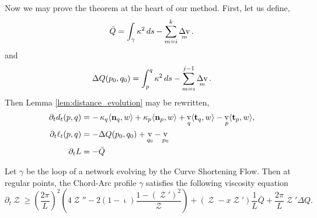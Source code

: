 \documentclass[11pt]{amsart}
\DeclareMathOperator{\tangspeed}{v}
\DeclareMathOperator{\chordarcprofile}{\mathcal{Z}}
\DeclareMathOperator{\corneranglespeed}{{\Delta v}}
\DeclareMathOperator{\tangindicator}{\iota}
\begin{document}
Now we may prove the theorem at the heart of our method. First, let us define,
\[
\bar{Q} = \int_{\gamma} \curvecurv^2 ds - \sum_{m=i}^{k} \corneranglespeed_m.
\]
and
\[
\Delta Q(p_0, q_0) = \int_p^q \curvecurv^2 ds - \sum_{m=i}^{j-1} \corneranglespeed_m.
\]
Then Lemma \ref{lem:distance_evolution} may be rewritten,
\begin{equation}
\label{eq:distance_evolution_q}
\begin{split}
\partial_t d_t(p, q) &= -\curvecurv_q \ip{\nor_q}{w} + \curvecurv_p \ip{\nor_p}{w} + \tangspeed_q \ip{\tang_q}{w} - \tangspeed_p \ip{\tang_p}{w}, \\
\partial_t \ell_t(p, q) &= -\Delta Q(p_0, q_0) + \tangspeed_{q_0} - \tangspeed_{p_0} \\
\partial_t L &= -\bar{Q}
\end{split}
\end{equation}

\begin{theorem}
\label{thm:csf_viscosity}

Let $\gamma$ be the loop of a network evolving by the Curve Shortening Flow. Then at regular points, the Chord-Arc profile $\gamma$ satisfies the following viscosity equation
\[
\partial_t \chordarcprofile \geq \left(\frac{2\pi}{L}\right)^2 \left(4 \chordarcprofile'' - 2 (1-\tangindicator) \frac{1 - (\chordarcprofile')^2}{\chordarcprofile}\right) + \left(\chordarcprofile - x \chordarcprofile'\right) \frac{1}{L} \bar{Q} + \frac{2\pi}{L} \chordarcprofile' \Delta Q.
\]
\end{theorem}
\end{document}
